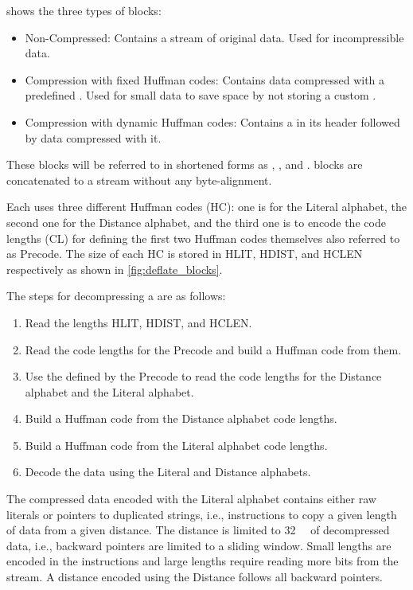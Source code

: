  shows the three types of  blocks:
\begin{itemize}
    \item Non-Compressed: Contains a stream of original data. Used for incompressible data.
    \item Compression with fixed Huffman codes: Contains data compressed with a predefined \huffcode.
          Used for small data to save space by not storing a custom \huffcode.
    \item Compression with dynamic Huffman codes: Contains a \huffcode in its header followed by data compressed with it.
\end{itemize}
These blocks will be referred to in shortened forms as \rawblock, \fixedblock, and \dynblock.
 blocks are concatenated to a  stream without any byte-alignment.

Each \dynblock uses three different Huffman codes (HC): one is for the Literal alphabet, the second one for the Distance alphabet, and the third one is to encode the code lengths (CL) for defining the first two Huffman codes themselves also referred to as Precode.
The size of each HC is stored in HLIT, HDIST, and HCLEN respectively as shown in \cref{fig:deflate_blocks}.

The steps for decompressing a \dynblock are as follows:
\begin{enumerate}
    \item Read the lengths HLIT, HDIST, and HCLEN.
    \item Read the code lengths for the Precode and build a Huffman code from them.
    \item Use the \huffcode defined by the Precode to read the code lengths for the Distance alphabet and the Literal alphabet.
    \item Build a Huffman code from the Distance alphabet code lengths.
    \item Build a Huffman code from the Literal alphabet code lengths.
    \item Decode the  data using the Literal and Distance alphabets.
\end{enumerate}

The compressed data encoded with the Literal alphabet contains either raw literals or pointers to duplicated strings, i.e., instructions to copy a given length of data from a given distance.
The distance is limited to \SI{32}{\kibi\byte} of decompressed data, i.e., backward pointers are limited to a sliding window.
Small lengths are encoded in the instructions and large lengths require reading more bits from the stream.
A distance encoded using the Distance \huffcode follows all backward pointers.

